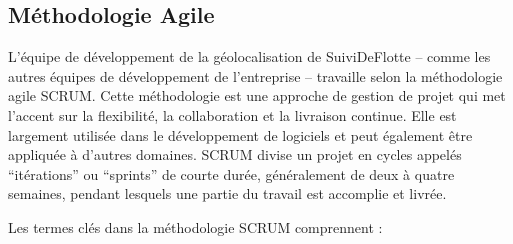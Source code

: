 \subsection{Méthodologie Agile}\label{subsec:agile}

L'équipe de développement de la géolocalisation de SuiviDeFlotte -- comme les autres équipes de développement de l'entreprise -- travaille selon la méthodologie agile SCRUM. Cette méthodologie est une approche de gestion de projet qui met l'accent sur la flexibilité, la collaboration et la livraison continue. Elle est largement utilisée dans le développement de logiciels et peut également être appliquée à d'autres domaines. SCRUM divise un projet en cycles appelés ``itérations'' ou ``sprints'' de courte durée, généralement de deux à quatre semaines, pendant lesquels une partie du travail est accomplie et livrée.

Les termes clés dans la méthodologie SCRUM comprennent :

